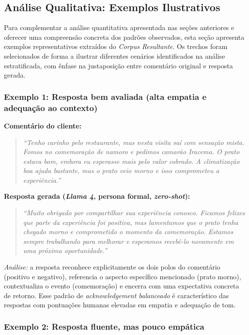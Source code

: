 \documentclass[12pt, a4paper]{article}
\numberwithin{equation}{section}
\begin{document}
\subsection{Análise Qualitativa: Exemplos Ilustrativos}
 \label{subsec:analise_qualitativa}
 
 Para complementar a análise quantitativa apresentada nas seções anteriores e oferecer uma 
compreensão concreta dos padrões observados, esta seção apresenta exemplos representativos 
extraídos do \textit{Corpus Resultante}. Os trechos foram selecionados de forma a ilustrar 
diferentes cenários identificados na análise estratificada, com ênfase na justaposição entre 
comentário original e resposta gerada.
 
 \subsubsection*{Exemplo 1: Resposta bem avaliada (alta empatia e adequação ao contexto)}
 
 \noindent\textbf{Comentário do cliente:}
 \begin{quote}
 \textit{``Tenho carinho pelo restaurante, mas nesta visita saí com sensação mista. Fomos no 
comemoração de namoro e pedimos camarão Iracema. O prato estava bom, embora eu esperasse mais pelo
 valor cobrado. A climatização boa ajuda bastante, mas o prato veio morno e isso comprometeu a 
experiência.''}
 \end{quote}
 
 \noindent\textbf{Resposta gerada (\textit{Llama 4}, persona formal, \textit{zero-shot}):}
 \begin{quote}
 \textit{``Muito obrigado por compartilhar sua experiência conosco. Ficamos felizes que parte da 
experiência foi positiva, mas lamentamos que o prato tenha chegado morno e comprometido o momento 
da comemoração. Estamos sempre trabalhando para melhorar e esperamos recebê-lo novamente em uma 
próxima oportunidade.''}
 \end{quote}
 
 \noindent\textit{Análise:} a resposta reconhece explicitamente os dois polos do comentário 
(positivo e negativo), referencia o aspecto específico mencionado (prato morno), contextualiza o 
evento (comemoração) e encerra com uma expectativa concreta de retorno. Esse padrão de 
\textit{acknowledgement balanceado} é característico das respostas com pontuações humanas elevadas
 em empatia e adequação de tom.
 
 \subsubsection*{Exemplo 2: Resposta fluente, mas pouco empática}
 
\end{document}
